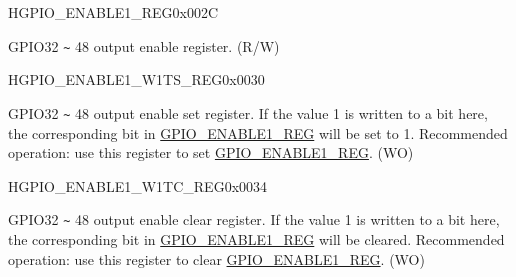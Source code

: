 \begin{register}{H}{GPIO\_ENABLE1\_REG}{0x{}002C}\label{regdesc:GPIOENABLE1REG}
%
%
\regnewline%
\begin{regdesc}\begin{reglist}
\label{fielddesc:GPIOENABLE1DATA}\item [GPIO\_ENABLE1\_DATA] GPIO32 \verb+~+ 48 output enable register. (R/W)
\end{reglist}\end{regdesc}
\end{register}


\begin{register}{H}{GPIO\_ENABLE1\_W1TS\_REG}{0x{}0030}\label{regdesc:GPIOENABLE1W1TSREG}
%
%
\regnewline%
\begin{regdesc}\begin{reglist}
\label{fielddesc:GPIOENABLE1W1TS}\item [GPIO\_ENABLE1\_W1TS] GPIO32 \verb+~+ 48 output enable set register. If the value 1 is written to a bit here, the corresponding bit in \hyperref[regdesc:GPIOENABLE1REG]{GPIO\_ENABLE1\_REG} will be set to 1. Recommended operation: use this register to set \hyperref[regdesc:GPIOENABLE1REG]{GPIO\_ENABLE1\_REG}. (WO)
\end{reglist}\end{regdesc}
\end{register}


\begin{register}{H}{GPIO\_ENABLE1\_W1TC\_REG}{0x{}0034}\label{regdesc:GPIOENABLE1W1TCREG}
%
%
\regnewline%
\begin{regdesc}\begin{reglist}
\label{fielddesc:GPIOENABLE1W1TC}\item [GPIO\_ENABLE1\_W1TC] GPIO32 \verb+~+ 48 output enable clear register. If the value 1 is written to a bit here, the corresponding bit in \hyperref[regdesc:GPIOENABLE1REG]{GPIO\_ENABLE1\_REG} will be cleared. Recommended operation: use this register to clear \hyperref[regdesc:GPIOENABLE1REG]{GPIO\_ENABLE1\_REG}. (WO)
\end{reglist}\end{regdesc}
\end{register}


